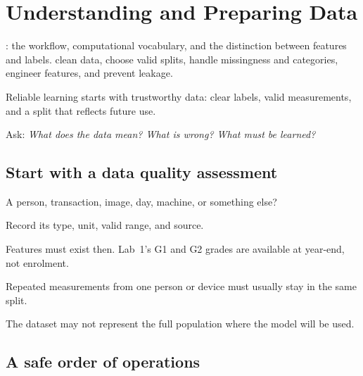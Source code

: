 \chapter{Understanding and Preparing Data}
\label{ch:data}

\chapterguide%
  {: the workflow, computational vocabulary, and the distinction between features and labels.}
  {clean data, choose valid splits, handle missingness and categories, engineer features, and prevent leakage.}

Reliable learning starts with trustworthy data: clear labels, valid measurements, and a split that reflects future use.

Ask: \emph{What does the data mean? What is wrong? What must be learned?}

\section{Start with a data quality assessment}

\begin{mlsteps}
  \item {} A person, transaction, image, day, machine, or something else?
  \item {} Record its type, unit, valid range, and source.
  \item {} Features must exist then. Lab~1's G1 and G2 grades are available at year-end, not enrolment.
  \item {} Repeated measurements from one person or device must usually stay in the same split.
  \item {} The dataset may not represent the full population where the model will be used.
\end{mlsteps}

\section{A safe order of operations}

\begin{mlfigure}
\end{mlfigure}

